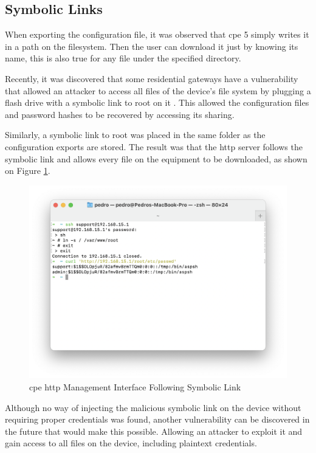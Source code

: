 \subsection{Symbolic Links}

When exporting the configuration file, it was observed that \gls{cpe} 5 simply writes it in a path on the filesystem. Then the user can download it just by knowing its name, this is also true for any file under the specified directory.

Recently, it was discovered that some residential gateways have a vulnerability that allowed an attacker to access all files of the device’s file system by plugging a flash drive with a symbolic link to root on it \cite{cve-2020-5795}. This allowed the configuration files and password hashes to be recovered by accessing its sharing.

Similarly, a symbolic link to root was placed in the same folder as the configuration exports are stored. The result was that the \gls{http} server follows the symbolic link and allows every file on the equipment to be downloaded, as shown on Figure \ref{figure:cpe_symlink}.

\begin{figure}[h]
    \centering
    \includegraphics[width=\linewidth]{contents/http-management-interface-analysis/symbolic-links/cpe-http-management-interface-following-symbolic-link.png}
    \caption{\gls{cpe} \gls{http} Management Interface Following Symbolic Link}
    \label{figure:cpe_symlink}
\end{figure}

Although no way of injecting the malicious symbolic link on the device without requiring proper credentials was found, another vulnerability can be discovered in the future that would make this possible. Allowing an attacker to exploit it and gain access to all files on the device, including plaintext credentials.

\FloatBarrier
